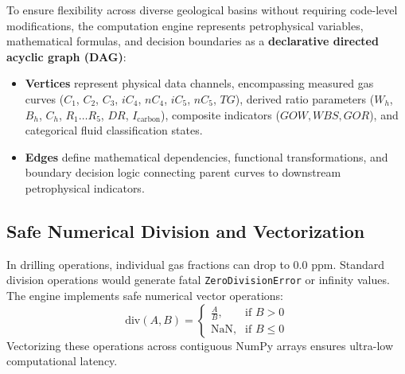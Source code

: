 To ensure flexibility across diverse geological basins without requiring code-level modifications, the computation engine represents petrophysical variables, mathematical formulas, and decision boundaries as a \textbf{declarative directed acyclic graph (DAG)}:
\begin{itemize}
    \item \textbf{Vertices} represent physical data channels, encompassing measured gas curves ($C_1$, $C_2$, $C_3$, $iC_4$, $nC_4$, $iC_5$, $nC_5$, $TG$), derived ratio parameters ($W_h$, $B_h$, $C_h$, $R_1 \dots R_5$, $DR$, $I_{\text{carbon}}$), composite indicators ($GOW, WBS, GOR$), and categorical fluid classification states.
    \item \textbf{Edges} define mathematical dependencies, functional transformations, and boundary decision logic connecting parent curves to downstream petrophysical indicators.
\end{itemize}

\subsection{Safe Numerical Division and Vectorization}
In drilling operations, individual gas fractions can drop to $0.0\text{ ppm}$. Standard division operations would generate fatal \texttt{ZeroDivisionError} or infinity values. The engine implements safe numerical vector operations:
\begin{equation}
    \text{div}(A, B) = \begin{cases} \frac{A}{B}, & \text{if } B > 0 \\ \text{NaN}, & \text{if } B \le 0 \end{cases}
\end{equation}
Vectorizing these operations across contiguous NumPy arrays ensures ultra-low computational latency.

